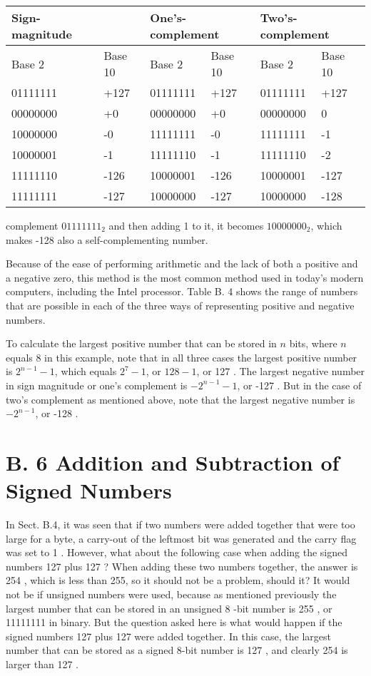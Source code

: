\documentclass[10pt]{article}
\begin{document}
\begin{center}
\begin{tabular}{|l|l|l|l|l|l|}
\hline
Sign-magnitude &  & \multicolumn{2}{|l|}{One's-complement} & \multicolumn{2}{l|}{Two's-complement} \\
\hline
Base 2 & Base 10 & Base 2 & Base 10 & Base 2 & Base 10 \\
\hline
01111111 & +127 & 01111111 & +127 & 01111111 & +127 \\
\hline
00000000 & +0 & 00000000 & +0 & 00000000 & 0 \\
\hline
10000000 & -0 & 11111111 & -0 & 11111111 & -1 \\
\hline
10000001 & -1 & 11111110 & -1 & 11111110 & -2 \\
\hline
11111110 & -126 & 10000001 & -126 & 10000001 & -127 \\
\hline
11111111 & -127 & 10000000 & -127 & 10000000 & -128 \\
\hline
\end{tabular}
\end{center}

complement $01111111_{2}$ and then adding 1 to it, it becomes $10000000_{2}$, which makes -128 also a self-complementing number.

Because of the ease of performing arithmetic and the lack of both a positive and a negative zero, this method is the most common method used in today's modern computers, including the Intel processor. Table B. 4 shows the range of numbers that are possible in each of the three ways of representing positive and negative numbers.

To calculate the largest positive number that can be stored in $n$ bits, where $n$ equals 8 in this example, note that in all three cases the largest positive number is $2^{n-1}-1$, which equals $2^{7}-1$, or $128-1$, or 127 . The largest negative number in sign magnitude or one's complement is $-2^{n-1}-1$, or -127 . But in the case of two's complement as mentioned above, note that the largest negative number is $-2^{n-1}$, or -128 .

\section*{B. 6 Addition and Subtraction of Signed Numbers}
In Sect. B.4, it was seen that if two numbers were added together that were too large for a byte, a carry-out of the leftmost bit was generated and the carry flag was set to 1 . However, what about the following case when adding the signed numbers 127 plus 127 ? When adding these two numbers together, the answer is 254 , which is less than 255, so it should not be a problem, should it? It would not be if unsigned numbers were used, because as mentioned previously the largest number that can be stored in an unsigned 8 -bit number is 255 , or 11111111 in binary. But the question asked here is what would happen if the signed numbers 127 plus 127 were added together. In this case, the largest number that can be stored as a signed 8-bit number is 127 , and clearly 254 is larger than 127 .
\end{document}
